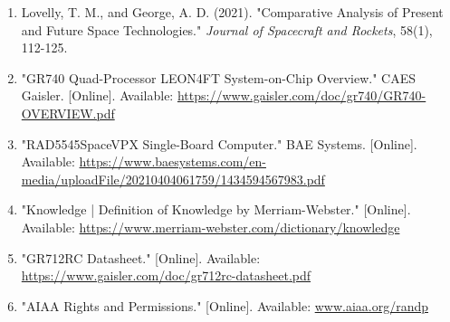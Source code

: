 \documentclass[a4paper, 11pt]{article}
\begin{document}
\begin{enumerate}
    \item Lovelly, T. M., and George, A. D. (2021). "Comparative Analysis of Present and Future Space Technologies." \textit{Journal of Spacecraft and Rockets}, 58(1), 112-125.
    
    \item "GR740 Quad-Processor LEON4FT System-on-Chip Overview." CAES Gaisler. [Online]. Available: \url{https://www.gaisler.com/doc/gr740/GR740-OVERVIEW.pdf}
    
    \item "RAD5545\texttrademark SpaceVPX Single-Board Computer." BAE Systems. [Online]. Available: \url{https://www.baesystems.com/en-media/uploadFile/20210404061759/1434594567983.pdf}
    
    \item "Knowledge | Definition of Knowledge by Merriam-Webster." [Online]. Available: \url{https://www.merriam-webster.com/dictionary/knowledge}
    
    \item "GR712RC Datasheet." [Online]. Available: \url{https://www.gaisler.com/doc/gr712rc-datasheet.pdf}
    
    \item "AIAA Rights and Permissions." [Online]. Available: \url{www.aiaa.org/randp}
\end{enumerate}
\end{document}
